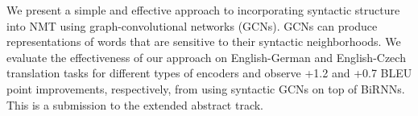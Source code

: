 We present a simple and effective approach to incorporating syntactic structure into NMT  using graph-convolutional networks (GCNs). GCNs can produce representations of words that are sensitive to their syntactic neighborhoods. We evaluate the effectiveness of our approach on English-German and English-Czech translation tasks for different types of encoders and observe +1.2 and +0.7 BLEU point improvements, respectively, from using syntactic GCNs on top of BiRNNs. This is a submission to the extended abstract track.
